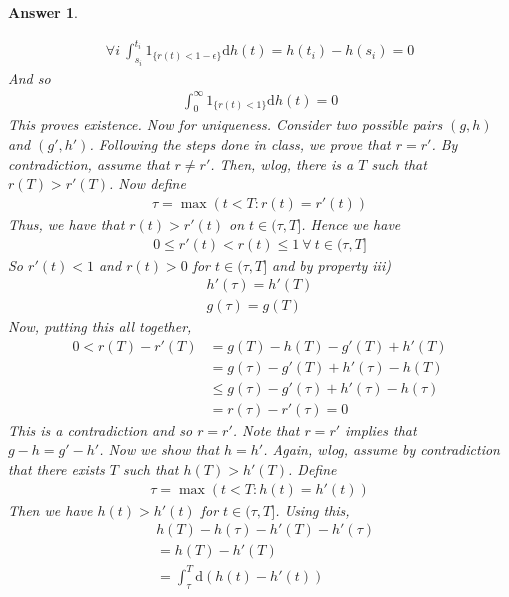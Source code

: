 \documentclass[12pt]{article}
\theoremstyle{colon}
\newtheorem*{answer}{Answer}
\begin{document}
\begin{answer}
\begin{enumerate}[label=\roman*)]
      \begin{gather*}
        \forall i \ \int_{s_i}^{t_i} 1_{\{r(t)<1-\epsilon\}} \text{d}h(t) = h(t_i) - h(s_i) = 0
      \end{gather*}
      And so
      \begin{gather*}
        \int_0^\infty 1_{\{r(t)<1\}} \text{d}h(t) = 0
      \end{gather*}
      This proves existence. Now for uniqueness. Consider two possible pairs $(g,h)$ and $(g',h')$. Following the steps done in class, we prove that $r = r'$. By contradiction, assume that $r \neq r'$. Then, wlog, there is a $T$ such that $r(T) > r'(T)$. Now define
      \begin{gather*}
        \tau = \max (t < T :  r(t) = r'(t))
      \end{gather*}
      Thus, we have that $r(t) > r'(t)$ on $t \in (\tau, T]$. Hence we have
      \begin{gather*}
        0 \leq r'(t) < r(t) \leq 1 \ \forall \ t \in (\tau, T]
      \end{gather*}
      So $r'(t) < 1$ and $r(t) > 0$ for $t \in (\tau, T]$ and by property iii)
      \begin{gather*}
        h'(\tau) = h'(T) \\
        g(\tau) = g(T)
      \end{gather*}
      Now, putting this all together,
      \begin{align*}
        0 < r(T) - r'(T) &= g(T) - h(T) - g'(T) + h'(T) \\
        &= g(\tau) - g'(T) + h'(\tau) - h(T) \\
        &\leq g(\tau) - g'(\tau) + h'(\tau) - h(\tau) \\
        &= r(\tau) - r'(\tau) = 0
      \end{align*}
      This is a contradiction and so $r = r'$. Note that $r = r'$ implies that $g - h = g' - h'$. Now we show that $h = h'$. Again, wlog, assume by contradiction that there exists $T$ such that $h(T) > h'(T)$. Define
      \begin{gather*}
        \tau = \max (t < T :  h(t) = h'(t))
      \end{gather*}
      Then we have $h(t) > h'(t)$ for $t \in (\tau, T]$. Using this,
      \begin{align*}
        &h(T) - h(\tau) - h'(T) - h'(\tau) \\
        &= h(T) - h'(T) \\
        &= \int_\tau^T \text{d}(h(t) - h'(t)) \\

\end{align*}
\end{enumerate}
\end{answer}
\end{document}
